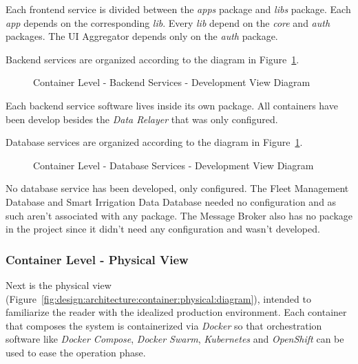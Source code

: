 Each frontend service is divided between the \textit{apps} package and \textit{libs} package. Each \textit{app} depends on the corresponding \textit{lib}. Every \textit{lib} depend on the \textit{core} and \textit{auth} packages. The UI Aggregator depends only on the \textit{auth} package.

Backend services are organized according to the diagram in Figure~\ref{fig:design:architecture:container:process:diagram:development:backend}.

\begin{figure}[H]
   \centering
   \resizebox{\columnwidth}{!}
   {
      
   }
   \caption[Container Level - Backend Services - Development View Diagram]{Container Level - Backend Services - Development View Diagram}
   \label{fig:design:architecture:container:process:diagram:development:backend}
\end{figure}

Each backend service software lives inside its own package. All containers have been develop besides the \textit{Data Relayer} that was only configured.

Database services are organized according to the diagram in Figure~\ref{fig:design:architecture:container:process:diagram:development:backend}.

\begin{figure}[H]
   \centering
   \resizebox{\columnwidth}{!}
   {
      
   }
   \caption[Container Level - Database Services - Development View Diagram]{Container Level - Database Services - Development View Diagram}
   \label{fig:design:architecture:container:process:diagram:development:database}
\end{figure}

No database service has been developed, only configured. The Fleet Management Database and Smart Irrigation Data Database needed no configuration and as such aren't associated with any package. The Message Broker also has no package in the project since it didn't need any configuration and wasn't developed.

\subsubsection{Container Level - Physical View}
\label{subsubsec:design:architecture:container:physical}

Next is the physical view (Figure~\ref{fig:design:architecture:container:physical:diagram}), intended to familiarize the reader with the idealized production environment. Each container that composes the system is containerized via \textit{Docker} so that orchestration software like \textit{Docker Compose}, \textit{Docker Swarm}, \textit{Kubernetes} and \textit{OpenShift} can be used to ease the operation phase.

